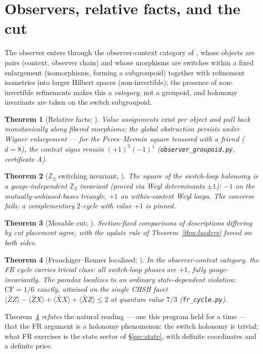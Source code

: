 \documentclass[11pt]{article}
\newtheorem{theorem}{Theorem}
\theoremstyle{definition}
\theoremstyle{remark}
\newcommand{\CF}{\mathrm{CF}}
\begin{document}
\section{Observers, relative facts, and the cut}\label{sec:observer}
The observer enters through the observer-context category of \cite{paperD}, whose
objects are pairs (context, observer chain) and whose morphisms are switches within a fixed
enlargement (isomorphisms, forming a subgroupoid) together with refinement isometries into larger
Hilbert spaces (non-invertible); the presence of non-invertible refinements makes this a
\emph{category}, not a groupoid, and holonomy invariants are taken on the switch subgroupoid.

\begin{theorem}[Relative facts; \cite{paperD}]\label{thm:relative}
Value assignments exist per object and pull back monotonically along fibered morphisms;
the global obstruction persists under Wigner enlargement --- for the Peres--Mermin
square tensored with a friend ($d=8$), the context signs remain $(+1)^5(-1)^1$
(\texttt{observer\_groupoid.py}, certificate A).
\end{theorem}

\begin{theorem}[$\mathbb Z_2$ switching invariant; \cite{paperD}]\label{thm:z2}
The square of the switch-loop holonomy is a gauge-independent $\mathbb Z_2$ invariant
(proved via Weyl determinants $\pm1$): $-1$ on the mutually-unbiased-bases triangle,
$+1$ on within-context Weyl loops. The converse fails: a complementary $2$-cycle with
value $+1$ is pinned.
\end{theorem}

\begin{theorem}[Movable cut; \cite{paperD}]\label{thm:cut}
Section-fixed comparisons of descriptions differing by cut placement agree, with the
update rule of Theorem~\ref{thm:lueders} forced on both sides.
\end{theorem}

\begin{theorem}[Frauchiger--Renner localized; \cite{paperD}]\label{thm:fr}
In the observer-context category, the FR cycle carries trivial class: all switch-loop
phases are $+1$, fully gauge-invariantly. The paradox localizes to an ordinary
state-dependent violation: $\CF=1/6$ exactly, attained on the single CHSH facet
$\langle \bar Z Z\rangle-\langle \bar Z X\rangle+\langle \bar X X\rangle+\langle \bar X
Z\rangle\le 2$ at quantum value $7/3$ (\texttt{fr\_cycle.py}).
\end{theorem}
Theorem~\ref{thm:fr} \emph{refutes} the natural reading --- one this program held for a
time --- that the FR argument is a holonomy phenomenon: the switch holonomy
is trivial; what FR exercises is the state sector of \S\ref{sec:state}, with definite
coordinates and a definite price.
\end{document}
